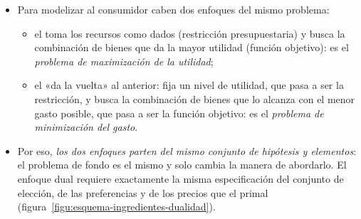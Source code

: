 \documentclass[11pt]{article}
\begin{document}
\begin{itemize}
\item Para modelizar al consumidor caben dos enfoques del mismo problema:
  \begin{itemize}
  \item el  toma los recursos como dados (restricción presupuestaria) y busca la combinación de bienes que da la mayor utilidad (función objetivo): es el \emph{problema de maximización de la utilidad};
  \item el  «da la vuelta» al anterior: fija un nivel de utilidad, que pasa a ser la restricción, y busca la combinación de bienes que lo alcanza con el menor gasto posible, que pasa a ser la función objetivo: es el \emph{problema de minimización del gasto}.
  \end{itemize}
\item Por eso, \emph{los dos enfoques parten del mismo conjunto de hipótesis y elementos}: el problema de fondo es el mismo y solo cambia la manera de abordarlo. El enfoque dual requiere exactamente la misma especificación del conjunto de elección, de las preferencias y de los precios que el primal (figura~\ref{figu:esquema-ingredientes-dualidad}).
\end{itemize}

\begin{infografia}[H]
\centering
\caption{De las preferencias a las dos demandas: los mismos ingredientes, con los papeles cambiados}\label{figu:esquema-ingredientes-dualidad}
\end{infografia}
\end{document}
